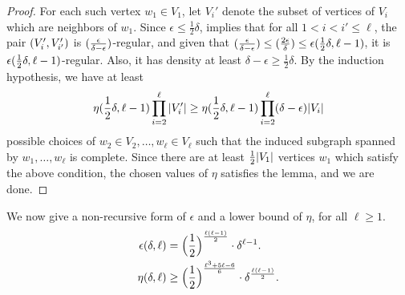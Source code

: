 \begin{lemma}
\begin{proof}
                For each such vertex $w_1 \in V_1$, let $V_i'$ denote the subset of vertices of $V_i$ which are neighbors
                of $w_1$.
                Since $\epsilon \leq \frac{1}{2}\delta$,  implies that for all
                $1 < i < i' \leq \ell$, the pair $( V_i', V_{i'}' )$ is $( \frac{\epsilon}{\delta-\epsilon} )$-regular,
                and given that $( \frac{\epsilon}{\delta-\epsilon} ) \leq ( \frac{2\epsilon}{\delta} ) \leq \epsilon( \frac{1}{2}\delta, \ell-1 )$,
                it is $\epsilon( \frac{1}{2}\delta, \ell-1 )$-regular.
                Also, it has density at least $\delta - \epsilon \geq \frac{1}{2} \delta$.
                By the induction hypothesis, we have at least
                \[
                    \eta ( \frac{1}{2}\delta, \ell-1 ) \prod_{i=2}^\ell | V_i' |
                        \geq \eta ( \frac{1}{2}\delta, \ell-1 ) \prod_{i=2}^\ell ( \delta - \epsilon ) | V_i |
                \]
                possible choices of $w_2 \in V_2, \dots, w_\ell \in V_\ell$ such that the induced subgraph spanned by
                $w_1, \dots, w_\ell$ is complete.
                Since there are at least $\frac{1}{2} | V_1 |$ vertices $w_1$ which satisfy the above condition,
                the chosen values of $\eta$ satisfies the lemma, and we are done.
            \end{proof}
        \end{lemma}

        \begin{remark}
            We now give a non-recursive form of $\epsilon$ and a lower bound of $\eta$, for all $\ell \geq 1$.
            \begin{align*}
                \epsilon(\delta, \ell) & = \Bigl( \frac{1}{2} \Bigr)^{\frac{\ell(\ell-1)}{2}} \cdot \delta^{\ell-1}. \\
                \eta(\delta, \ell) & \geq \Bigl( \frac{1}{2} \Bigr)^{\frac{\ell^3+5\ell-6}{6}} \cdot \delta^{\frac{\ell(\ell-1)}{2}}.
            \end{align*}
        \end{remark}

